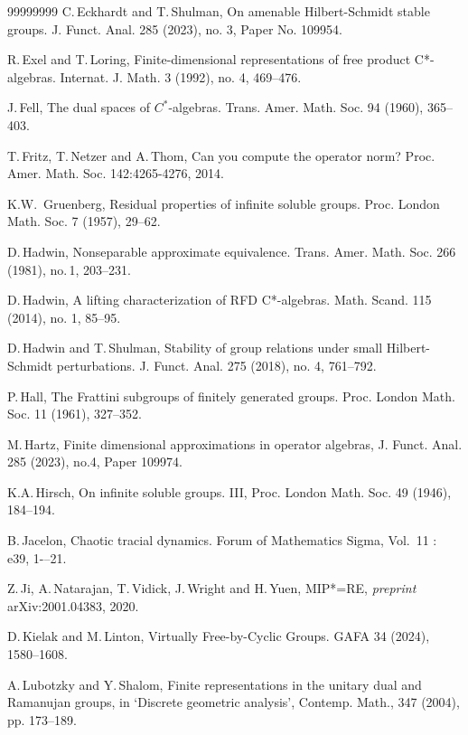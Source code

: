 \documentclass[11 pt, leqno, hidelinks]{amsart}%
\theoremstyle{plain}
\numberwithin{equation}{section}
\begin{document}
\begin{thebibliography}{99999999}
C.\,Eckhardt and T.\,Shulman, On amenable Hilbert-Schmidt stable groups.  J. Funct. Anal. 285 (2023), no. 3, Paper No. 109954.

R.\,Exel and T.\,Loring,
Finite-dimensional representations of free product C*-algebras.
Internat. J. Math. 3 (1992), no. 4, 469--476.

J.\,Fell, The dual spaces of $C^*$-algebras.  Trans. Amer. Math. Soc. 94 (1960), 365--403.


T.\,Fritz, T.\,Netzer and A.\,Thom, Can you compute the operator norm? Proc. Amer. Math.
Soc. 142:4265-4276, 2014.

K.W.\, Gruenberg, Residual properties of infinite soluble groups. Proc. London Math. Soc. 7 (1957), 29--62.

D.\,Hadwin, Nonseparable approximate equivalence. Trans. Amer. Math. Soc. 266 (1981), no.\,1, 203--231.


D.\,Hadwin,  A lifting characterization of RFD C*-algebras. Math. Scand. 115 (2014),  no. 1,  85--95.


D.\,Hadwin and T.\,Shulman, Stability of group relations under small Hilbert-Schmidt perturbations. J. Funct. Anal. 275 (2018), no. 4, 761--792.

P.\,Hall,   The Frattini subgroups of finitely generated groups.  Proc. London Math. Soc. 11 (1961), 327--352.

M.\,Hartz, Finite dimensional approximations in operator algebras,
J. Funct.  Anal. 285 (2023), no.4, Paper 109974.

 K.A.\,Hirsch, On infinite soluble groups. III, Proc. London Math. Soc. 49 (1946), 184--194.

 B.\,Jacelon, Chaotic tracial dynamics. Forum of Mathematics Sigma, Vol.\ 11 : e39, 1-–21.

 Z.\,Ji, A.\,Natarajan, T.\,Vidick, J.\,Wright and H.\,Yuen, MIP*=RE, \emph{preprint} arXiv:2001.04383, 2020.

 D.\,Kielak and M.\,Linton, Virtually Free-by-Cyclic Groups. GAFA 34 (2024), 1580--1608.

A.\,Lubotzky and Y.\,Shalom,  Finite representations in the unitary dual and Ramanujan groups, in `Discrete geometric analysis',
Contemp. Math., 347 (2004), pp. 173--189.


\end{thebibliography}
\end{document}
